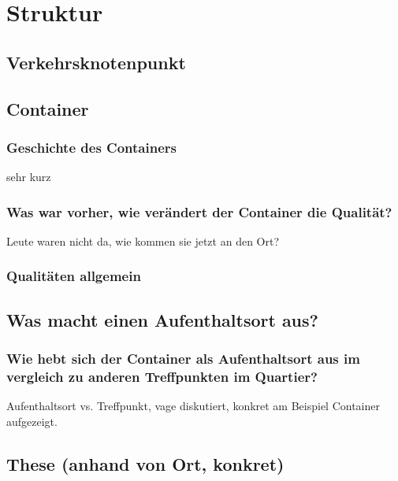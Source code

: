 \documentclass[a4paper,ngerman,11pt]{scrartcl}
\begin{document}
\section{Struktur}
\label{sec-6}

\subsection{Verkehrsknotenpunkt}
\label{sec-6-1}

\subsection{Container}
\label{sec-6-2}

\subsubsection{Geschichte des Containers}
\label{sec-6-2-1}

sehr kurz

\subsubsection{Was war vorher, wie verändert der Container die Qualität?}
\label{sec-6-2-2}

Leute waren nicht da, wie kommen sie jetzt an den Ort?

\subsubsection{Qualitäten allgemein}
\label{sec-6-2-3}

\subsection{Was macht einen Aufenthaltsort aus?}
\label{sec-6-3}

\subsubsection{Wie hebt sich der Container als Aufenthaltsort aus im vergleich zu anderen Treffpunkten im Quartier?}
\label{sec-6-3-1}

Aufenthaltsort vs. Treffpunkt, vage diskutiert, konkret am Beispiel
Container aufgezeigt.

\subsection{These (anhand von Ort, konkret)}
\label{sec-6-4}
\end{document}
